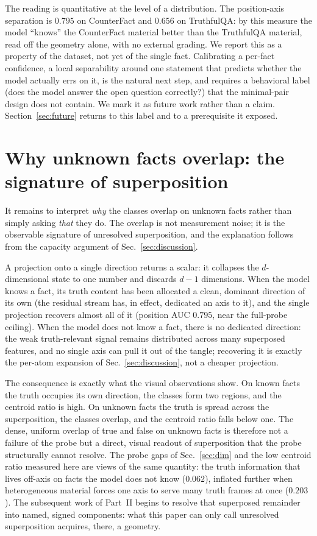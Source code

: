 \documentclass[11pt]{article}
\begin{document}
The reading is quantitative at the level of a distribution. The position-axis
separation is $0.795$ on CounterFact and $0.656$ on TruthfulQA: by this
measure the model ``knows'' the CounterFact material better than the
TruthfulQA material, read off the geometry alone, with no external grading.
We report this as a property of the dataset, not yet of the single fact.
Calibrating a per-fact confidence, a local separability around one statement
that predicts whether the model actually errs on it, is the natural next
step, and requires a behavioral label (does the model answer the open
question correctly?) that the minimal-pair design does not contain. We mark
it as future work rather than a claim. Section~\ref{sec:future} returns to
this label and to a prerequisite it exposed.

\section{Why unknown facts overlap: the signature of superposition}
\label{sec:why}

It remains to interpret \emph{why} the classes overlap on unknown facts
rather than simply asking \emph{that} they do. The overlap is not measurement
noise; it is the observable signature of unresolved superposition, and the
explanation follows from the capacity argument of Sec.~\ref{sec:discussion}.

A projection onto a single direction returns a scalar: it collapses the
$d$-dimensional state to one number and discards $d - 1$ dimensions. When the
model knows a fact, its truth content has been allocated a clean, dominant
direction of its own (the residual stream has, in effect, dedicated an axis
to it), and the single projection recovers almost all of it (position AUC
$0.795$, near the full-probe ceiling). When the model does not know a fact,
there is no dedicated direction: the weak truth-relevant signal remains
distributed across many superposed features, and no single axis can pull it
out of the tangle; recovering it is exactly the per-atom expansion of
Sec.~\ref{sec:discussion}, not a cheaper projection.

The consequence is exactly what the visual observations show. On known facts
the truth occupies its own direction, the classes form two regions, and the
centroid ratio is high. On unknown facts the truth is spread across the
superposition, the classes overlap, and the centroid ratio falls below one.
The dense, uniform overlap of true and false on unknown facts is therefore
not a failure of the probe but a direct, visual readout of superposition that
the probe structurally cannot resolve. The probe gaps of
Sec.~\ref{sec:dim} and the low centroid ratio measured here are views of the
same quantity: the truth information that lives off-axis on facts the model
does not know ($0.062$), inflated further when heterogeneous material forces
one axis to serve many truth frames at once ($0.203$). The subsequent work of Part~II begins to resolve that superposed
remainder into named, signed components: what this paper can only call
unresolved superposition acquires, there, a geometry.
\end{document}
